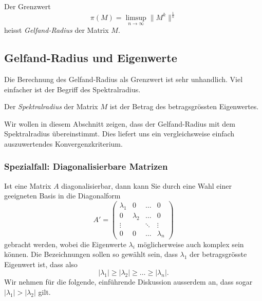 \begin{definition}
\label{buch:eigenwerte:def:gelfand-radius}
Der Grenzwert
\[
\pi(M)
=
\limsup_{n\to\infty} \|M^k\|^{\frac1k}
\]
heisst {\em Gelfand-Radius} der Matrix $M$.
%
\end{definition}


%
%
\subsection{Gelfand-Radius und Eigenwerte
\label{buch:subsection:potenzreihen}}
Die Berechnung des Gelfand-Radius als Grenzwert ist sehr unhandlich.
Viel einfacher ist der Begriff des Spektralradius.
%

\begin{definition}
\label{buch:definition:spektralradius}
Der {\em Spektralradius} der Matrix $M$ ist der Betrag des betragsgrössten
%
Eigenwertes.
\end{definition}

Wir wollen in diesem Abschnitt zeigen, dass der Gelfand-Radius mit
dem Spektralradius übereinstimmt.
Dies liefert uns ein vergleichsweise einfach auszuwertendes Konvergenzkriterium.
%

\subsubsection{Spezialfall: Diagonalisierbare Matrizen}
Ist eine Matrix $A$ diagonalisierbar, dann kann Sie durch eine Wahl
einer geeigneten Basis in die Diagonalform
%
%
\[
A'
=
\begin{pmatrix}
\lambda_1&        0&\dots &0\\
0        &\lambda_2&\dots &0\\
\vdots   &         &\ddots&\vdots\\
0        &        0&\dots &\lambda_n
\end{pmatrix}
\]
gebracht werden, wobei die Eigenwerte $\lambda_i$  möglicherweise auch
komplex sein können.
%
Die Bezeichnungen sollen so gewählt sein, dass $\lambda_1$ der
betragsgrösste Eigenwert ist, dass also
\[
|\lambda_1| \ge |\lambda_2| \ge \dots \ge |\lambda_n|.
\]
Wir nehmen für die folgende, einführende Diskussion ausserdem an, dass
sogar $|\lambda_1|>|\lambda_2|$ gilt.


